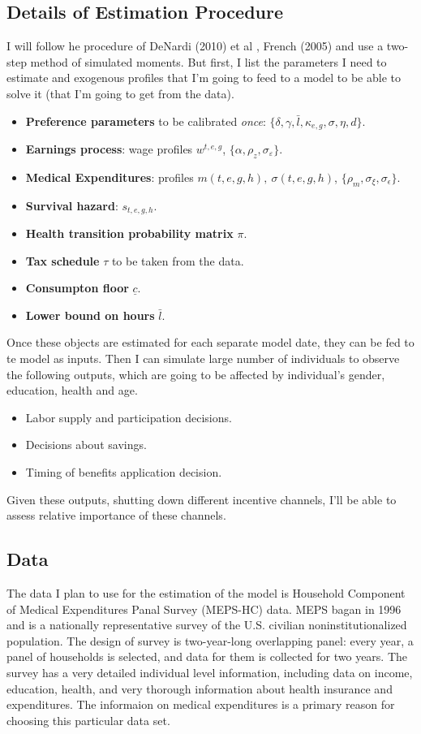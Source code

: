 \documentclass[
10pt, %
a4paper, %
oneside, %
headinclude,footinclude, %
BCOR5mm, %
]{scrartcl}
\begin{document}
\subsection{Details of Estimation Procedure}
I will follow he procedure of DeNardi (2010) et al \cite{DeNardi2010}, French (2005) \cite{French2005} and use a two-step method of simulated moments. But first, I list the parameters I need to estimate and exogenous profiles that I'm going to feed to a model to be able to solve it (that I'm going to get from the data).
\begin{itemize}
\item \textbf{Preference parameters} to be calibrated \emph{once}: $\{\delta,\gamma,\bar{l},\kappa_{e,g},\sigma,\eta,d\}$.
\item \textbf{Earnings process}: wage profiles $w^{t,e,g}$, $\{\alpha,\rho_z,\sigma_{\varepsilon}\}$.
\item \textbf{Medical Expenditures}:  profiles $m(t,e,g,h),\ \sigma(t,e,g,h)$, $\{\rho_m,\sigma_{\xi},\sigma_{\epsilon}\}$.
\item \textbf{Survival hazard}: $s_{t,e,g,h}$.
\item \textbf{Health transition probability matrix} $\pi$.
\item \textbf{Tax schedule} $\tau$ to be taken from the data.
\item \textbf{Consumpton floor} $\underline{c}$.
\item \textbf{Lower bound on hours} $\bar{l}$.
\end{itemize}
Once these objects are estimated for each separate model date, they can be fed to te model  as inputs. Then I can simulate large number of individuals to observe the following outputs, which are going to be affected by individual's gender, education, health and age.
\begin{itemize}
\item Labor supply and participation decisions.
\item Decisions about savings.
\item Timing of benefits application decision.
\end{itemize}
Given these outputs, shutting down different incentive channels, I'll be able to assess relative importance of these channels.

\subsection{Data}
The data I plan to use for the estimation of the model is Household Component of Medical Expenditures Panal Survey (MEPS-HC) data. MEPS bagan in 1996 and is a nationally representative survey of the U.S. civilian noninstitutionalized population. The design of survey is two-year-long overlapping panel: every year, a panel of households is selected, and data for them is collected for two years. The survey has a very detailed individual level information, including data on income, education, health, and very thorough information about health insurance and expenditures. The informaion on medical expenditures is a primary reason for choosing this particular data set. 
\end{document}
